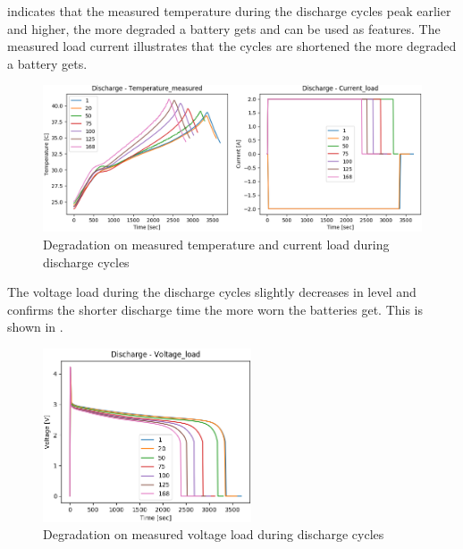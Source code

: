 \documentclass[english, a4paper]{report}
\begin{document}
{{{{                 indicates that the measured temperature during the discharge cycles peak earlier and higher, the more degraded a battery gets and can be used as features. The measured load current illustrates that the cycles are shortened the more degraded a battery gets.
                
                \begin{figure}[H]
                    \centering \includegraphics[width=1\textwidth]{DischargeDegradation2}
                    \caption{Degradation on measured temperature and current load during discharge cycles}
                    \label{fig:DischargeDegradation2}
                \end{figure}
                
                The voltage load during the discharge cycles slightly decreases in level and confirms the shorter discharge time the more worn the batteries get. This is shown in .
                
                \begin{figure}[H]
                    \centering \includegraphics[width=0.55\textwidth]{DischargeDegradation3}
                    \caption{Degradation on measured voltage load during discharge cycles}
                    \label{fig:DischargeDegradation3}
                \end{figure}
                
}}}}
\end{document}

